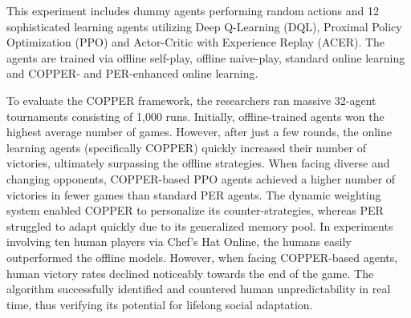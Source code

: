  This experiment includes dummy agents performing random actions and 12 sophisticated learning agents utilizing Deep Q-Learning (DQL), Proximal Policy Optimization (PPO) and Actor-Critic with Experience Replay (ACER). The agents are trained via offline self-play, offline naive-play, standard online learning and COPPER- and PER-enhanced online learning. 
 
 To evaluate the COPPER framework, the researchers ran massive 32-agent tournaments consisting of 1,000 runs. Initially, offline-trained agents won the highest average number of games. However, after just a few rounds, the online learning agents (specifically COPPER) quickly increased their number of victories, ultimately surpassing the offline strategies. When facing diverse and changing opponents, COPPER-based PPO agents achieved a higher number of victories in fewer games than standard PER agents. The dynamic weighting system enabled COPPER to personalize its counter-strategies, whereas PER struggled to adapt quickly due to its generalized memory pool. In experiments involving ten human players via Chef's Hat Online, the humans easily outperformed the offline models. However, when facing COPPER-based agents, human victory rates declined noticeably towards the end of the game. The algorithm successfully identified and countered human unpredictability in real time, thus verifying its potential for lifelong social adaptation.
 
 
